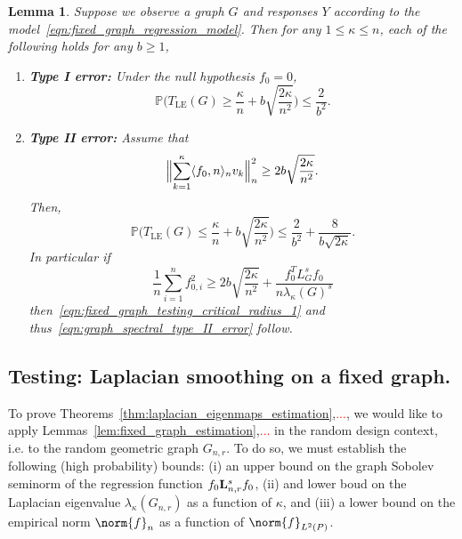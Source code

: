 \documentclass{article}
\newcommand{\1}{\mathbf{1}}
\newcommand{\Lap}{{\bf L}}
\newcommand{\Pbb}{\mathbb{P}}
\newcommand{\dotp}[2]{\langle #1, #2 \rangle}
\newcommand{\LE}{\mathrm{LE}}
\theoremstyle{alden}
\theoremstyle{aldenthm}
\newtheorem{lemma}{Lemma}
\theoremstyle{definition}
\theoremstyle{remark}
\begin{document}
\begin{lemma}
	\label{lem:fixed_graph_testing}
	Suppose we observe a graph $G$ and responses $Y$ according to the model~\eqref{eqn:fixed_graph_regression_model}. Then for any $1 \leq \kappa \leq n$, each of the following holds for any $b \geq 1$,
	\begin{enumerate}
		\item \textbf{Type I error:} Under the null hypothesis $f_0 = 0$,
		\begin{equation}
		\label{eqn:graph_spectral_type_I_error}
		\Pbb\biggl(T_{\LE}(G) \geq \frac{\kappa}{n} + b\sqrt{\frac{2\kappa}{n^2}}\biggr) \leq \frac{2}{b^2}.
		\end{equation}
		\item \textbf{Type II error:} Assume that
		\begin{equation}
		\label{eqn:fixed_graph_testing_critical_radius_1}
		\Bigl\|\sum_{k = 1}^{\kappa} \dotp{f_0}{n}_n v_k\Bigr\|_n^2 \geq 2b\sqrt{\frac{2\kappa}{n^2}}.
		\end{equation}
		Then,
		\begin{equation}
		\label{eqn:graph_spectral_type_II_error}
		\Pbb\biggl(T_{\LE}(G) \leq \frac{\kappa}{n} + b\sqrt{\frac{2\kappa}{n^2}}\biggr) \leq \frac{2}{b^2} + \frac{8}{b\sqrt{2\kappa}}.
		\end{equation}
		In particular if
		\begin{equation}
		\label{eqn:fixed_graph_testing_critical_radius}
		\frac{1}{n} \sum_{i = 1}^{n} f_{0,i}^2 \geq 2b\sqrt{\frac{2\kappa}{n^2}} + \frac{f_0^T L_G^s f_0}{n\lambda_{\kappa}(G)^s}
		\end{equation}
		then~\eqref{eqn:fixed_graph_testing_critical_radius_1} and thus~\eqref{eqn:graph_spectral_type_II_error} follow.
	\end{enumerate}
\end{lemma}

\subsection{Testing: Laplacian smoothing on a fixed graph.}

\clearpage
To prove Theorems~\ref{thm:laplacian_eigenmaps_estimation},\textcolor{red}{...}, we would like to apply Lemmas~\ref{lem:fixed_graph_estimation},\textcolor{red}{...} in the random design context, i.e. to the random geometric graph $G_{n,r}$. To do so, we must establish the following (high probability) bounds: (i) an upper bound on the graph Sobolev seminorm of the regression function $f_0 \Lap_{n,r}^s f_0$, (ii) and lower boud on the Laplacian eigenvalue $\lambda_{\kappa}(G_{n,r})$ as a function of $\kappa$, and (iii) a lower bound on the empirical norm $\norm{f}_{n}$ as a function of $\norm{f}_{L^2(P)}$. 
\end{document}

